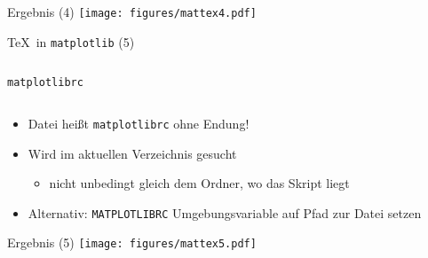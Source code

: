 \AddToShipoutPictureFG*{\ShowFramePicture}
\begin{frame}{Ergebnis (4)}
  \centering
  \texttt{[image: figures/mattex4.pdf]}
\end{frame}

\begin{frame}[fragile]{\TeX\ in \texttt{matplotlib} (5)}
  \inputminted{python}{script/mattex5.py}
\end{frame}

\begin{frame}[fragile]{\texttt{matplotlibrc}}
  \inputminted{text}{../common/matplotlibrc}

  \begin{itemize}
    \item Datei heißt \texttt{matplotlibrc} ohne Endung!
    \item Wird im aktuellen Verzeichnis gesucht
      \begin{itemize}
        \item nicht unbedingt gleich dem Ordner, wo das Skript liegt
      \end{itemize}
    \item Alternativ: \texttt{MATPLOTLIBRC} Umgebungsvariable auf Pfad zur Datei setzen
  \end{itemize}
\end{frame}

\AddToShipoutPictureFG*{\ShowFramePicture}
\begin{frame}{Ergebnis (5)}
  \centering
  \texttt{[image: figures/mattex5.pdf]}
\end{frame}
